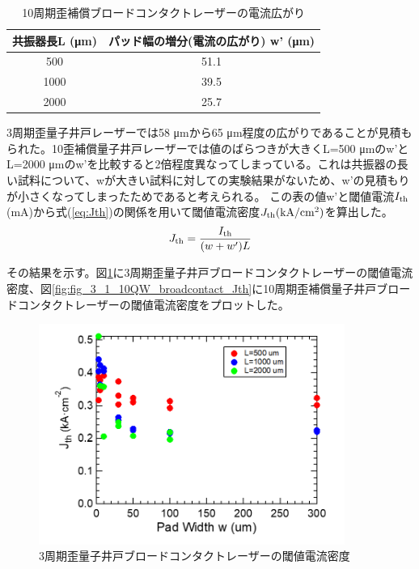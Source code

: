 \begin{table}[h]
  \caption{10周期歪補償ブロードコンタクトレーザーの電流広がり}
  \label{table:table_10QW_broadcontact_w_eff}
  \centering
  \begin{tabular}{cc}
    \hline
    共振器長L (\si{\micro\metre})  & パッド幅の増分(電流の広がり) w' (\si{\micro\metre})   \\
    \hline \hline
     500 & 51.1  \\
    1000  & 39.5 \\
    2000  & 25.7 \\ 
    \hline
  \end{tabular}
\end{table}

3周期歪量子井戸レーザーでは58 \si{\micro\metre}から65 \si{\micro\metre}程度の広がりであることが見積もられた。10歪補償量子井戸レーザーでは値のばらつきが大きくL=500 \si{\micro\metre}のw'とL=2000 \si{\micro\metre}のw'を比較すると2倍程度異なってしまっている。これは共振器の長い試料について、wが大きい試料に対しての実験結果がないため、w'の見積もりが小さくなってしまったためであると考えられる。
この表の値w'と閾値電流$I_{\rm{th}}$(mA)から式(\ref{eq:Jth})の関係を用いて閾値電流密度$J_{\rm{th}} \rm{(kA/cm^2)}$を算出した。
\begin{eqnarray}
J_{\rm{th}}=\dfrac{I_{\rm{th}}}{(w+w')L}
\label{eq:Jth}
\end{eqnarray}

その結果を示す。図\ref{fig:fig_3_1_3QW_broadcontact_Jth}に3周期歪量子井戸ブロードコンタクトレーザーの閾値電流密度、図\ref{fig:fig_3_1_10QW_broadcontact_Jth}に10周期歪補償量子井戸ブロードコンタクトレーザーの閾値電流密度をプロットした。

\begin{figure}[h]
	\centering
	\includegraphics[width=10cm]{figure/fig_3_1_3QW_broadcontact_Jth.png}
		\caption{3周期歪量子井戸ブロードコンタクトレーザーの閾値電流密度}
		\label{fig:fig_3_1_3QW_broadcontact_Jth}
\end{figure}

